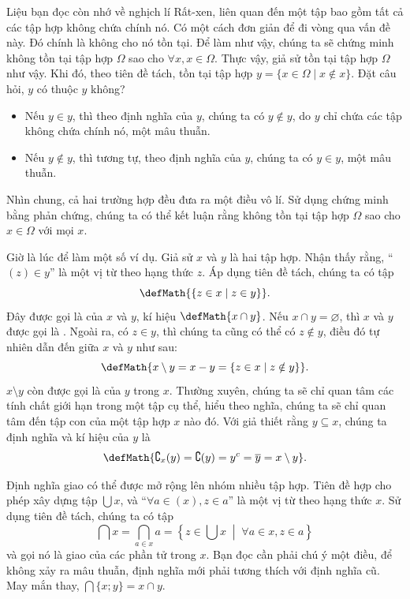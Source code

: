 Liệu bạn đọc còn nhớ về nghịch lí Rất-xen, liên quan đến một tập bao gồm tất cả các tập hợp không chứa chính nó. Có một cách đơn giản để đi vòng qua vấn đề này. Đó chính là không cho nó tồn tại. Để làm như vậy, chúng ta sẽ chứng minh không tồn tại tập hợp $\Omega$ sao cho $\forall x, x \in \Omega$. Thực vậy, giả sử tồn tại tập hợp $\Omega$ như vậy. Khi đó, theo tiên đề tách, tồn tại tập hợp $y = \{x \in \Omega \mid x \notin x \}$. Đặt câu hỏi, $y$ có thuộc $y$ không?
\begin{itemize}
   \item Nếu $y \in y$, thì theo định nghĩa của $y$, chúng ta có $y \notin y$, do $y$ chỉ chứa các tập không chứa chính nó, một mâu thuẫn.
   \item Nếu $y \notin y$, thì tương tự, theo định nghĩa của $y$, chúng ta có $y \in y$, một mâu thuẫn.
\end{itemize}
Nhìn chung, cả hai trường hợp đều đưa ra một điều vô lí. Sử dụng chứng minh bằng phản chứng, chúng ta có thể kết luận rằng không tồn tại tập hợp $\Omega$ sao cho $x \in \Omega$ với mọi $x$.

Giờ là lúc để làm một số ví dụ. Giả sử $x$ và $y$ là hai tập hợp. Nhận thấy rằng, ``$(z) \in y$'' là một vị từ theo hạng thức $z$. Áp dụng tiên đề tách, chúng ta có tập
\begin{equation*}
    \defMath{\{ z \in x \mid z \in y \}}.
\end{equation*}
Đây được gọi là  của $x$ và $y$, kí hiệu $\defMath{x \cap y}$. Nếu $x \cap y = \varnothing$, thì $x$ và $y$ được gọi là . Ngoài ra, có $z \in y$, thì chúng ta cũng có thể có $z \notin y$, điều đó tự nhiên dẫn đến  giữa $x$ và $y$ như sau:
\begin{equation*}
    \defMath{x \setminus y = x - y = \{ z \in x \mid z \notin y \}}.
\end{equation*}
$x \setminus y$ còn được gọi là  của $y$ trong $x$. Thường xuyên, chúng ta sẽ chỉ quan tâm các tính chất giới hạn trong một tập cụ thể, hiểu theo nghĩa, chúng ta sẽ chỉ quan tâm đến tập con của một tập hợp $x$ nào đó. Với giả thiết rằng $y \subseteq x$, chúng ta định nghĩa và kí hiệu  của $y$ là $$\defMath{\complement_x(y) = \complement(y) = y^c = \overline{y} = x \setminus y}.$$

Định nghĩa giao có thể được mở rộng lên nhóm nhiều tập hợp. Tiên đề hợp cho phép xây dựng tập $\bigcup x$, và ``$\forall a \in (x), z \in a$'' là một vị từ theo hạng thức $x$. Sử dụng tiên đề tách, chúng ta có tập
{
   \boldmath 
   $$\bigcap x = \bigcap_{a\in x} a = \left\{z \in \bigcup x \;\middle|\; \forall a \in x, z \in a \right\}$$
}%
và gọi nó là giao của các phần tử trong $x$. Bạn đọc cần phải chú ý một điều, để không xảy ra mâu thuẫn, định nghĩa mới phải tương thích với định nghĩa cũ. May mắn thay, $\bigcap \{x; y\} = x \cap y$.


